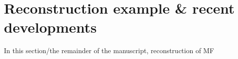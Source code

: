 \section{Reconstruction example & recent developments}

In this section/the remainder of the manuscript, reconstruction of MF 